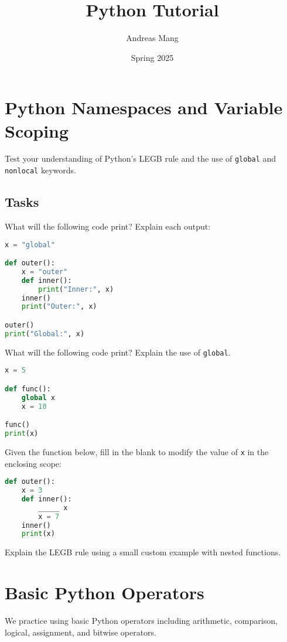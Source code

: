 \documentclass[11pt]{article}
\title{Python Tutorial}
\date{Spring 2025}
\author{Andreas Mang}
\begin{document}
\maketitle


\section*{Python Namespaces and Variable Scoping}

Test your understanding of Python’s LEGB rule and the use of \texttt{global} and \texttt{nonlocal} keywords.

\subsection*{Tasks}
\noindent What will the following code print? Explain each output:
\begin{lstlisting}[language=Python]
x = "global"

def outer():
    x = "outer"
    def inner():
        print("Inner:", x)
    inner()
    print("Outer:", x)

outer()
print("Global:", x)
\end{lstlisting}



\noindent What will the following code print? Explain the use of \texttt{global}.
\begin{lstlisting}[language=Python]
x = 5

def func():
    global x
    x = 10

func()
print(x)
\end{lstlisting}

\noindent Given the function below, fill in the blank to modify the value of \texttt{x} in the enclosing scope:
\begin{lstlisting}[language=Python]
def outer():
    x = 3
    def inner():
        _____ x
        x = 7
    inner()
    print(x)
\end{lstlisting}

\noindent Explain the LEGB rule using a small custom example with nested functions.


\section*{Basic Python Operators}
We practice using basic Python operators including arithmetic, comparison, logical, assignment, and bitwise operators.
\end{document}
